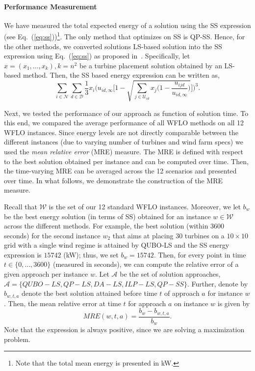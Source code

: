 \documentclass[preprint,12pt]{elsarticle}
\begin{document}
\paragraph{Performance Measurement} 

We have measured the total expected energy of a solution using the SS expression (see Eq.~(\ref{eq:ss}))\footnote{Note that the total mean energy is presented in kW.}.
The only method that optimizes on SS is QP-SS. Hence, for the other methods, we converted solutions
LS-based solution into the SS expression using Eq.~(\ref{eq:ss}) as proposed in~\cite{Zhang2014}. Specifically, let $x = (x_1, \ldots, x_k), k=n^2$ be a turbine placement solution obtained by an LS-based method.
Then, the SS based energy expression can be written as, 
$$\sum_{i\in \mathcal{N}}\sum_{d \in \mathcal{D}} \frac{1}{3} x_i \Bigg(u_{id,\infty} \Bigg[1-\sqrt{\sum_{j\in \mathcal{U}_{id}}x_j\bigg( 1-\frac{u_{ijd}}{u_{id,\infty}} \bigg) } \Bigg]    \Bigg)^3.$$ 

Next, we tested the performance of our approach as function of solution time. To this end, we 
compared the average performance of all WFLO methods on all 12 WFLO instances. Since energy levels are not directly comparable between the different instances (due to varying number of turbines and wind farm specs) we used the \emph{mean relative error} (MRE) measure. The MRE is defined with respect to the best solution obtained per instance and can be computed over time. Then, the
time-varying MRE can be averaged across the 12 scenarios and presented over time. In what follows, we demonstrate the construction of the MRE measure.

Recall that $\mathcal{W}$ is the set of our 12 standard WFLO instances. 
Moreover, we let $b_w$ be the best energy solution (in terms of SS) obtained for an instance $w \in \mathcal{W}$ 
across the different methods. For example, the best solution (within 3600 seconds) for the second instance $w_2$ that aims at placing $30$ turbines on a $10\times10$ grid with a single wind regime is attained by QUBO-LS and the SS energy expression is $15742$ (kW); thus, we set $b_w = 15742$. Then, for every point in time $t \in \{0,\ldots, 3600\}$ (measured in seconds), we can compute the relative error of a given approach per instance $w$. Let $\mathcal{A}$ be the set of solution approaches, $\mathcal{A}= \{QUBO-LS, QP-LS, DA-LS, ILP-LS, QP-SS\}$. Further, denote by $b_{w,t,a}$ denote the best solution attained before time $t$ of approach $a$ for instance $w$. Then, the mean relative error at time $t$ for approach $a$ on instance $w$ is given by \begin{equation}MRE(w,t,a) = \frac{b_w - b_{w,t,a}}{b_w}.\end{equation} Note that the expression is always positive, since we are solving a maximization problem.
\end{document}
